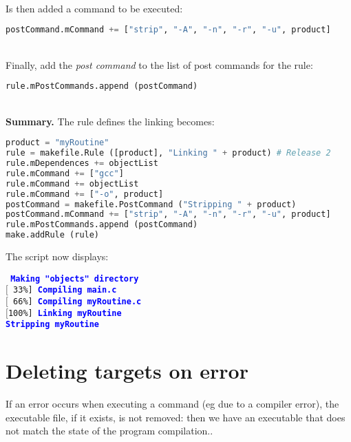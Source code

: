 \documentclass[a4paper,11pt]{extarticle}
\begin{document}
~\\Is then added a command to be executed:
\begin{lstlisting}[language=py]
postCommand.mCommand += ["strip", "-A", "-n", "-r", "-u", product]
\end{lstlisting}

~\\Finally, add the \emph{post command} to the list of post commands for the rule:
\begin{lstlisting}[language=py]
rule.mPostCommands.append (postCommand)
\end{lstlisting}


~\\{\bf Summary.} The rule defines the linking becomes:
\begin{lstlisting}[language=py]
product = "myRoutine"
rule = makefile.Rule ([product], "Linking " + product) # Release 2
rule.mDependences += objectList
rule.mCommand += ["gcc"]
rule.mCommand += objectList
rule.mCommand += ["-o", product]
postCommand = makefile.PostCommand ("Stripping " + product)
postCommand.mCommand += ["strip", "-A", "-n", "-r", "-u", product]
rule.mPostCommands.append (postCommand)
make.addRule (rule)
\end{lstlisting}

The script now displays:

\begin{mdframed}[hidealllines=true,backgroundcolor=lightgray!20]
\tt\footnotesize
\textcolor{blue}{\bf Making "objects" directory}\\
$[$~33\%]~\textcolor{blue}{\bf Compiling main.c}\\
$[$~66\%]~\textcolor{blue}{\bf Compiling myRoutine.c}\\
$[$100\%]~\textcolor{blue}{\bf Linking myRoutine}\\
\hspace*{4em}\textcolor{blue}{\bf Stripping myRoutine}
\end{mdframed}







\section{Deleting targets on error}

If an error occurs when executing a command (eg due to a compiler error), the executable file, if it exists, is not removed: then we have an executable that does not match the state of the program compilation..
\end{document}
